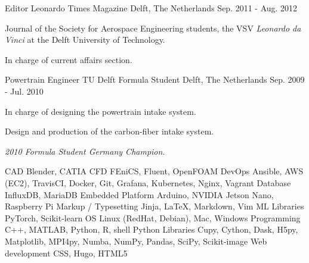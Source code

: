 \documentclass[11pt, a4paper]{awesome-cv}
\begin{document}


\begin{cventries}

  \cventry
    {Editor} %
    {Leonardo Times Magazine} %
    {Delft, The Netherlands} %
    {Sep. 2011 - Aug. 2012} %
    {
      \begin{cvitems} %
        \item {Journal of the Society for Aerospace Engineering students, the VSV \textit{Leonardo da Vinci} at the Delft University of Technology.}
        \item {In charge of current affairs section.}
      \end{cvitems}
    }

  \cventry
    {Powertrain Engineer} %
    {TU Delft Formula Student} %
    {Delft, The Netherlands} %
    {Sep. 2009 - Jul. 2010} %
    {
      \begin{cvitems} %
        \item {In charge of designing the powertrain intake system.}
        \item {Design and production of the carbon-fiber intake system.}
        \item {\textit{2010 Formula Student Germany Champion.}}
      \end{cvitems}
    }

\end{cventries}




\begin{cvskills}
  \cvskill
    {CAD}
    {Blender, CATIA}
  \cvskill
    {CFD}
    {FEniCS, Fluent, OpenFOAM}
  \cvskill
    {DevOps}
    {Ansible, AWS (EC2), TravisCI, Docker, Git, Grafana, Kubernetes, Nginx, Vagrant}
  \cvskill
    {Database}
    {InfluxDB, MariaDB}
  \cvskill
    {Embedded Platform}
    {Arduino, NVIDIA Jetson Nano, Raspberry Pi}
  \cvskill
    {Markup / Typesetting}
    {Jinja, LaTeX, Markdown, Vim}
  \cvskill
    {ML Libraries}
    {PyTorch, Scikit-learn}
  \cvskill
    {OS}
    {Linux (RedHat, Debian), Mac, Windows}
  \cvskill
    {Programming}
    {C++, MATLAB, Python, R, shell}
  \cvskill
    {Python Libraries}
    {Cupy, Cython, Dask, H5py, Matplotlib, MPI4py, Numba, NumPy, Pandas, SciPy, Scikit-image}
  \cvskill
    {Web development} %
    {CSS, Hugo, HTML5}
\end{cvskills}
\end{document}
